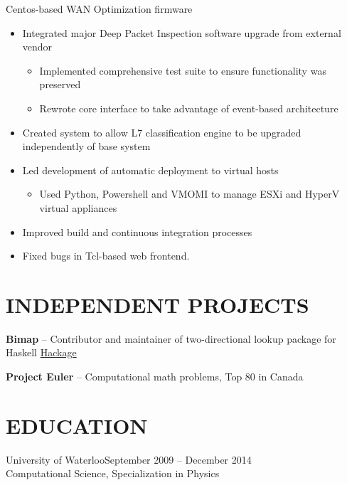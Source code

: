 \documentclass{res}
\begin{document}
\begin{resume}
         Centos-based WAN Optimization firmware
         \begin{itemize}
         \item Integrated major Deep Packet Inspection software upgrade from external vendor
           \begin{itemize}
           \item Implemented comprehensive test suite to ensure functionality was preserved
           \item Rewrote core interface to take advantage of event-based architecture
           \end{itemize}
         \item Created system to allow L7 classification engine to be upgraded independently of base system
         \item Led development of automatic deployment to virtual hosts
           \begin{itemize}
           \item Used Python, Powershell and VMOMI to manage ESXi and HyperV virtual appliances
           \end{itemize}
         \item Improved build and continuous integration processes
         \item Fixed bugs in Tcl-based web frontend.
         \end{itemize}

\section{INDEPENDENT PROJECTS}
  \vspace{3mm}

    {\bf Bimap} -- Contributor and maintainer of two-directional lookup package for Haskell
    \href{http://hackage.haskell.org/package/bimap-0.3.0}{Hackage}
    \vspace{-3mm}

    {\bf Project Euler} -- Computational math problems, Top 80 in Canada

\section{EDUCATION}
  \vspace{3mm}
    University of Waterloo\hfill September 2009 -- December 2014\\
    Computational Science, Specialization in Physics
    \vspace{-3mm}
 
\end{resume}
\end{document}
